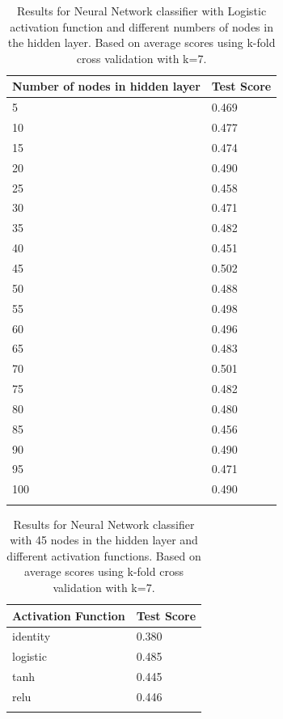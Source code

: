\begin{table}[]
\caption{Results for Neural Network classifier with Logistic activation function and different numbers of nodes in the hidden layer. Based on average scores using k-fold cross validation with k=7.}
\centering
\begin{tabular}{ll}
\toprule
Number of nodes in hidden layer & Test Score \\
\midrule
5                               & 0.469      \\
10                              & 0.477      \\
15                              & 0.474      \\
20                              & 0.490      \\
25                              & 0.458      \\
30                              & 0.471      \\
35                              & 0.482      \\
40                              & 0.451      \\
45                              & 0.502      \\
50                              & 0.488      \\
55                              & 0.498      \\
60                              & 0.496      \\
65                              & 0.483      \\
70                              & 0.501      \\
75                              & 0.482      \\
80                              & 0.480      \\
85                              & 0.456      \\
90                              & 0.490      \\
95                              & 0.471      \\
100                             & 0.490     \\
\bottomrule\\
\end{tabular}
\end{table}

\begin{table}[]
\caption{Results for Neural Network classifier with 45 nodes in the hidden layer and different activation functions. Based on average scores using k-fold cross validation with k=7.}
\centering
\begin{tabular}{ll}
\toprule
Activation Function & Test Score \\
\midrule
identity            & 0.380 \\
logistic            & 0.485 \\
tanh                & 0.445 \\
relu                & 0.446    \\
\bottomrule\\
\end{tabular}
\end{table}


